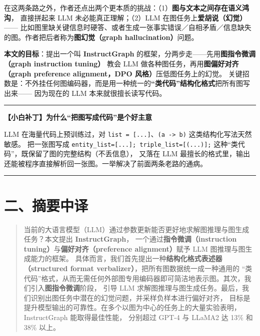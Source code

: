\documentclass[11pt,UTF8,fontset=fandol]{ctexart}
\newenvironment{tip}[1]{%
  \par\smallskip\noindent\rule{\linewidth}{0.4pt}\par\nobreak
  \noindent\textbf{【小白补丁】#1}\par\nobreak\noindent\ignorespaces
}{%
  \par\noindent\rule{\linewidth}{0.4pt}\par\smallskip
}
\begin{document}
在这两条路之外，作者还点出两个更本质的挑战：（1）\textbf{图与文本之间存在语义鸿沟}，
直接拼起来 LLM 未必能真正理解；（2）LLM 在图任务上\textbf{爱胡说（幻觉）}——
比如图里缺关键信息时硬答、或者生成一张事实错误／自相矛盾／信息缺失的图。作者把后者称为\textbf{图幻觉（graph hallucination）}问题。

\textbf{本文的目标}：提出一个叫 \textbf{InstructGraph} 的框架，分两步走——先用\textbf{图指令微调（graph instruction tuning）}
教会 LLM 做各种图任务，再用\textbf{图偏好对齐（graph preference alignment，DPO 风格）}压低图任务上的幻觉。
关键招数是：不外挂任何图编码器，而是用一种统一的\textbf{“类代码”结构化格式}把所有图写出来——
因为现在的 LLM 本来就很擅长读写代码。

\begin{tip}{为什么“把图写成代码”是个好主意}
LLM 在海量代码上预训练过，对 \texttt{list = [...]}、\texttt{(a -> b)} 这类结构化写法天然敏感。
把一张图写成 \texttt{entity\_list=[...]; triple\_list=[(...)];} 这种“类代码”，既保留了图的完整结构（不丢信息），
又落在 LLM 最擅长的格式里，输出还能被程序直接解析回一张图。一举解决了前面两条老路的通病。
\end{tip}

\section{二、摘要中译}

\begin{quote}
当前的大语言模型（LLM）通过参数更新能否更好地求解图推理与图生成任务？本文提出 \textbf{InstructGraph}，
一个通过\textbf{指令微调（instruction tuning）}与\textbf{偏好对齐（preference alignment）}赋予 LLM 图推理与图生成能力的框架。
具体而言，我们首先提出一种\textbf{结构化格式表述器（structured format verbalizer）}，把所有图数据统一成一种通用的
“类代码”格式，从而无需任何外部图专用编码器即可简洁地表示图。其次，我们引入\textbf{图指令微调}阶段，
引导 LLM 求解图推理与图生成任务。最后，我们识别出图任务中潜在的幻觉问题，并采样负样本进行偏好对齐，
目标是提升模型输出的可靠性。在多个以图为中心的任务上的大量实验表明，InstructGraph 能取得最佳性能，
分别超过 GPT-4 与 LLaMA2 达 13\% 和 38\% 以上。
\end{quote}
\end{document}
